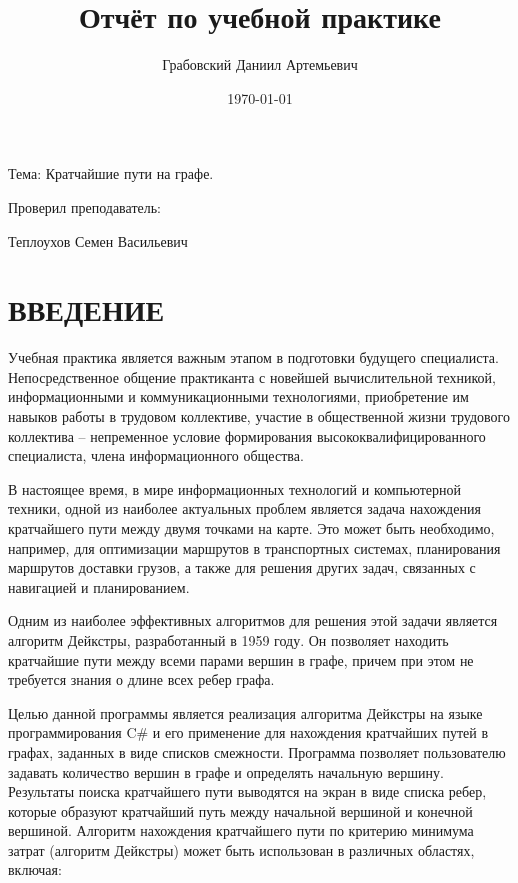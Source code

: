 \documentclass[a4paper,14pt, Times New Roman]{extarticle}
\title{Отчёт по учебной практике}
\author{Грабовский Даниил Артемьевич}
\date{\today}
\begin{document}
\maketitle

\begin{center}
Тема: Кратчайшие пути на графе.
\end{center}

\begin{flushright}
Проверил преподаватель:

Теплоухов Семен Васильевич
\end{flushright}

\newpage

\renewcommand\contentsname{СОДЕРЖАНИЕ}

\tableofcontents

\newpage
\section{ВВЕДЕНИЕ}

Учебная практика является важным этапом в подготовки будущего специалиста. Непосредственное общение практиканта с новейшей вычислительной техникой, информационными и коммуникационными технологиями, приобретение им навыков работы в трудовом коллективе, участие в общественной жизни трудового коллектива – непременное условие формирования высококвалифицированного специалиста, члена информационного общества.

В настоящее время, в мире информационных технологий и компьютерной техники, одной из наиболее актуальных проблем является задача нахождения кратчайшего пути между двумя точками на карте. Это может быть необходимо, например, для оптимизации маршрутов в транспортных системах, планирования маршрутов доставки грузов, а также для решения других задач, связанных с навигацией и планированием.

Одним из наиболее эффективных алгоритмов для решения этой задачи является алгоритм Дейкстры, разработанный в 1959 году. Он позволяет находить кратчайшие пути между всеми парами вершин в графе, причем при этом не требуется знания о длине всех ребер графа.

Целью данной программы является реализация алгоритма Дейкстры на языке программирования C\# и его применение для нахождения кратчайших путей в графах, заданных в виде списков смежности. Программа позволяет пользователю задавать количество вершин в графе и определять начальную вершину. Результаты поиска кратчайшего пути выводятся на экран в виде списка ребер, которые образуют кратчайший путь между начальной вершиной и конечной вершиной. 
Алгоритм нахождения кратчайшего пути по критерию минимума затрат (алгоритм Дейкстры) может быть использован в различных областях, включая:
\end{document}
